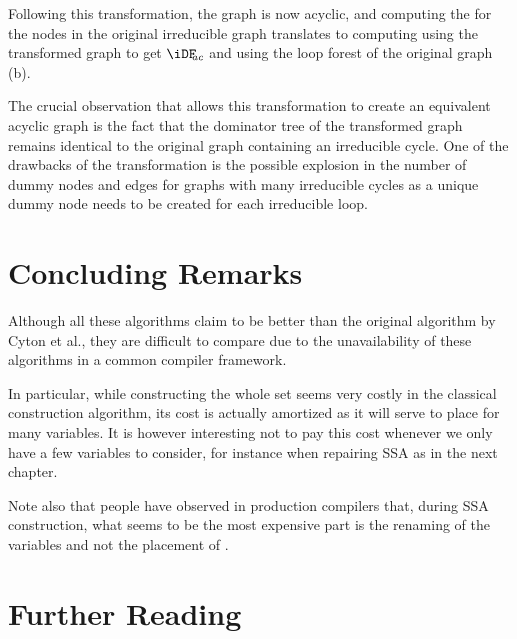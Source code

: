 {Following this transformation, the graph is now acyclic, and
computing the \iDF for the nodes in the original 
irreducible graph translates to computing \iDF using the transformed graph to 
get $\iDFac$ and using the loop forest of the original graph (b).

The 
crucial observation that allows this transformation to create an equivalent 
acyclic graph is the fact that the dominator tree of the transformed graph 
remains identical to the original graph containing an irreducible cycle. One of 
the drawbacks of the transformation is the possible explosion in the number of 
dummy nodes and edges for graphs with many irreducible cycles as a unique dummy 
node needs to be created for each irreducible loop.


\section{Concluding Remarks}

Although all these algorithms claim to be better than the original algorithm by Cyton et al., they are difficult to compare due to the unavailability of these algorithms in a common compiler framework. 

In particular, while constructing the whole \iDF set seems very costly in the classical construction algorithm, its cost is actually amortized as it will serve to place \phifuns for many variables.
It is however interesting not to pay this cost whenever we only have a few variables to consider, for instance when repairing SSA as in the next chapter.
 
Note also that people have observed in production compilers that, during SSA construction, what seems to be the most expensive part is the renaming of the variables and not the placement of \phifuns.



\section{Further Reading}

}
